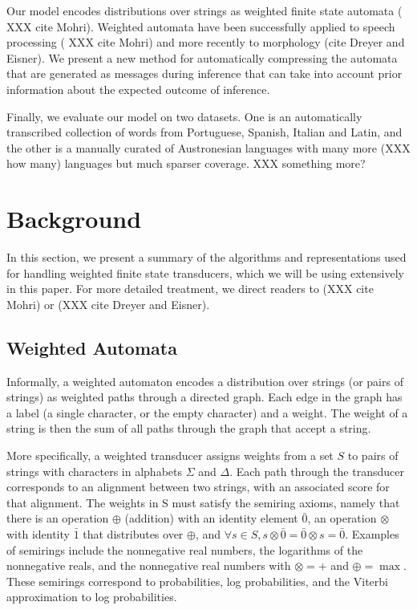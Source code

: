 \documentclass[11pt,a4paper]{article}
\begin{document}
Our model encodes distributions over strings as weighted finite
state automata ( XXX cite Mohri). Weighted automata have been
successfully applied to speech processing ( XXX cite Mohri) and
more recently to morphology (cite Dreyer and Eisner).  We present
a new method for automatically compressing the automata that are
generated as messages during inference that can take into account
prior information about the expected outcome of inference.

Finally, we evaluate our model on two datasets. One is an automatically
transcribed collection of words from Portuguese, Spanish, Italian
and Latin, and the other is a manually curated of Austronesian
languages with many more (XXX how many) languages but much sparser
coverage. XXX something more?

\section{Background}

In this section, we present a summary of the algorithms and
representations used for handling weighted finite state transducers,
which we will be using extensively in this paper. For more detailed
treatment, we direct readers to (XXX cite Mohri) or (XXX cite Dreyer
and Eisner).

\subsection{Weighted Automata}

Informally, a weighted automaton encodes a distribution over strings
(or pairs of strings) as weighted paths through a directed graph.
Each edge in the graph has a label (a single character, or the empty
character) and a weight. The weight of a string is then the sum
of all paths through the graph that accept a string.

More specifically, a weighted transducer assigns weights from a set
$S$ to pairs of strings with characters in alphabets $\Sigma$ and
$\Delta$. Each path through the transducer corresponds to an alignment
between two strings, with an associated score for that alignment.
The weights in S must satisfy the semiring axioms, namely that there
is an operation $\oplus$ (addition) with an identity element $\bar
0$, an operation $\otimes$ with identity $\bar 1$ that distributes
over $\oplus$, and $\forall s\in S, s\otimes \bar 0 = \bar 0 \otimes
s = \bar 0$. Examples of semirings include the nonnegative real
numbers, the logarithms of the nonnegative reals, and the nonnegative
real numbers with $\otimes = +$ and $\oplus = \max$. These semirings
correspond to probabilities, log probabilities, and the Viterbi
approximation to log probabilities.
\end{document}
